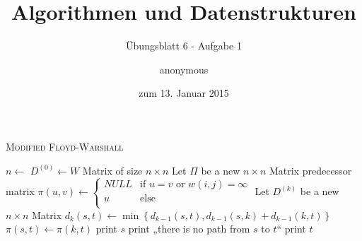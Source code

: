 \documentclass[a4paper]{scrartcl}
\title{Algorithmen und Datenstrukturen}
\subtitle{Übungsblatt 6 - Aufgabe 1}
\author{
    anonymous
}
\date{zum 13. Januar 2015}
\begin{document}
\maketitle

\begin{algorithm}
    \caption{\textsc{Modified Floyd-Warshall}}
    \label{alg:fw}
    \begin{algorithmic}[1]
            \State $n \gets$ 
            \State $D^{(0)} \gets W$
            \Comment Matrix of size $n \times n$
            \State Let $\Pi$ be a new $n \times n$ Matrix
            \Comment predecessor matrix
            \State $\pi(u, v) \gets
            \begin{cases}
                NULL & \text{if } u = v \text{ or } w(i,j) = \infty \\
                u & \text{else} \\
            \end{cases}$
                \State Let $D^{(k)}$ be a new $n \times n$ Matrix
                        \State $d_k(s,t) \gets \min \left\{ d_{k-1}(s,t),
                        d_{k-1}(s,k) + d_{k-1}(k,t) \right\}$
                            \State $\pi(s,t) \gets \pi(k, t)$
                        \EndIf
                    \EndFor
                \EndFor
            \EndFor
        \EndProcedure
                \State print $s$
                \State print „there is no path from $s$ to $t$“
            \Else
                \State {}
                \State print $t$
            \EndIf
        \EndProcedure
    \end{algorithmic}
\end{algorithm}
\end{document}
